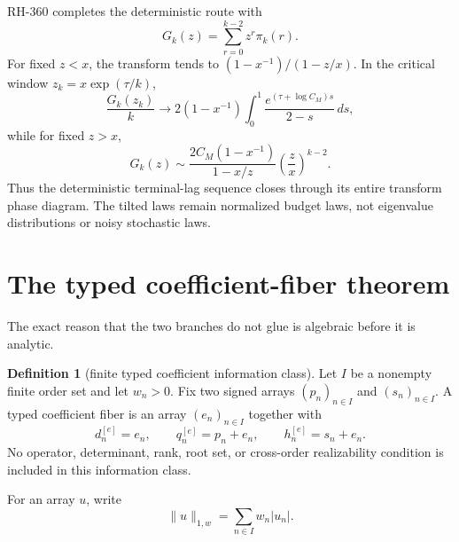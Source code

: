 \documentclass[11pt]{article}
\theoremstyle{definition}
\newtheorem{definition}[theorem]{Definition}
\theoremstyle{remark}
\begin{document}
RH-360 completes the deterministic route with
\begin{equation}\label{eq:G}
 G_k(z)=\sum_{r=0}^{k-2}z^r\pi_k(r).
\end{equation}
For fixed $z<x$, the transform tends to
$(1-x^{-1})/(1-z/x)$.  In the critical window
$z_k=x\exp(\tau/k)$,
\begin{equation}\label{eq:critical-transform}
 \frac{G_k(z_k)}{k}\longrightarrow
 2(1-x^{-1})\int_0^1
 \frac{e^{(\tau+\log C_M)s}}{2-s}\,ds,
\end{equation}
while for fixed $z>x$,
\begin{equation}\label{eq:super-transform}
 G_k(z)\sim
 \frac{2C_M(1-x^{-1})}{1-x/z}\left(\frac zx\right)^{k-2}.
\end{equation}
Thus the deterministic terminal-lag sequence closes through its entire
transform phase diagram.  The tilted laws remain normalized budget laws,
not eigenvalue distributions or noisy stochastic laws.

\section{The typed coefficient-fiber theorem}

The exact reason that the two branches do not glue is algebraic before it is
analytic.

\begin{definition}[finite typed coefficient information class]
Let $I$ be a nonempty finite order set and let $w_n>0$.  Fix two signed
arrays $(p_n)_{n\in I}$ and $(s_n)_{n\in I}$.  A typed coefficient fiber is
an array $(e_n)_{n\in I}$ together with
\begin{equation}\label{eq:fiber}
 d_n^{[e]}=e_n,\qquad
 q_n^{[e]}=p_n+e_n,\qquad
 h_n^{[e]}=s_n+e_n.
\end{equation}
No operator, determinant, rank, root set, or cross-order realizability
condition is included in this information class.
\end{definition}

For an array $u$, write
\begin{equation}\label{eq:weighted-norm}
 \|u\|_{1,w}=\sum_{n\in I}w_n|u_n|.
\end{equation}
\end{document}
